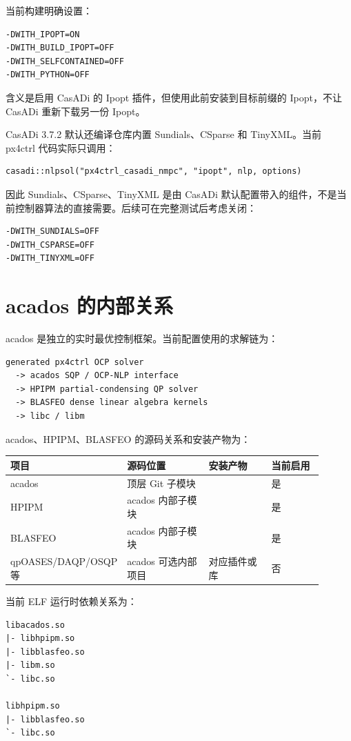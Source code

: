 \documentclass[UTF8,a4paper,11pt]{ctexart}
\newcommand{\code}[1]{\texttt{\detokenize{#1}}}
\newcommand{\yes}{\textcolor{green!45!black}{是}}
\newcommand{\no}{\textcolor{red!65!black}{否}}
\begin{document}
当前构建明确设置：
\begin{lstlisting}
-DWITH_IPOPT=ON
-DWITH_BUILD_IPOPT=OFF
-DWITH_SELFCONTAINED=OFF
-DWITH_PYTHON=OFF
\end{lstlisting}

含义是启用 CasADi 的 Ipopt 插件，但使用此前安装到目标前缀的 Ipopt，不让 CasADi 重新下载另一份 Ipopt。

CasADi 3.7.2 默认还编译仓库内置 Sundials、CSparse 和 TinyXML。当前 px4ctrl 代码实际只调用：
\begin{lstlisting}
casadi::nlpsol("px4ctrl_casadi_nmpc", "ipopt", nlp, options)
\end{lstlisting}

因此 Sundials、CSparse、TinyXML 是由 CasADi 默认配置带入的组件，不是当前控制器算法的直接需要。后续可在完整测试后考虑关闭：
\begin{lstlisting}
-DWITH_SUNDIALS=OFF
-DWITH_CSPARSE=OFF
-DWITH_TINYXML=OFF
\end{lstlisting}

\section{acados 的内部关系}

acados 是独立的实时最优控制框架。当前配置使用的求解链为：
\begin{lstlisting}
generated px4ctrl OCP solver
  -> acados SQP / OCP-NLP interface
  -> HPIPM partial-condensing QP solver
  -> BLASFEO dense linear algebra kernels
  -> libc / libm
\end{lstlisting}

acados、HPIPM、BLASFEO 的源码关系和安装产物为：
\begin{longtable}{p{0.22\linewidth}p{0.28\linewidth}p{0.22\linewidth}p{0.18\linewidth}}
\toprule
项目 & 源码位置 & 安装产物 & 当前启用 \\
\midrule
acados & 顶层 Git 子模块 & \code{libacados.so} & \yes \\
HPIPM & acados 内部子模块 & \code{libhpipm.so} & \yes \\
BLASFEO & acados 内部子模块 & \code{libblasfeo.so} & \yes \\
qpOASES/DAQP/OSQP 等 & acados 可选内部项目 & 对应插件或库 & \no \\
\bottomrule
\end{longtable}

当前 ELF 运行时依赖关系为：
\begin{lstlisting}
libacados.so
|- libhpipm.so
|- libblasfeo.so
|- libm.so
`- libc.so

libhpipm.so
|- libblasfeo.so
`- libc.so
\end{lstlisting}
\end{document}
